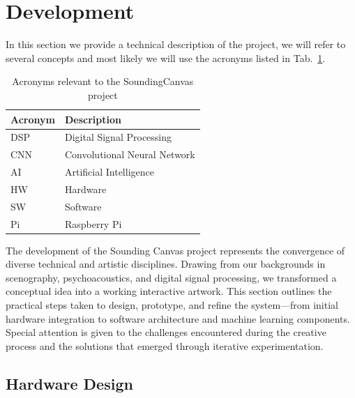 \documentclass{article}
\begin{document}
\section{Development}
In this section we provide a technical description of the project, we will refer to several concepts and most likely we will use the acronyms listed in Tab.~\ref{table:Acronyms}.
\begin{table}[h]
	\centering
	\begin{tabularx}{\textwidth} { 
			| >{\centering\arraybackslash}X
			| >{\centering\arraybackslash}X | }
		\hline
		\rowcolor{Gray}
		\textbf{Acronym} & \textbf{Description}\\
		\hline
		DSP & Digital Signal Processing \\
		\hline
		CNN & Convolutional Neural Network \\
		\hline
		AI & Artificial Intelligence \\
		\hline
		HW & Hardware \\
		\hline
		SW & Software \\
		\hline
		Pi & Raspberry Pi \\
		\hline
	\end{tabularx}
	\caption{Acronyms relevant to the SoundingCanvas project}
	\label{table:Acronyms}
\end{table}
The development of the Sounding Canvas project represents the convergence of diverse technical and artistic disciplines. Drawing from our backgrounds in scenography, psychoacoustics, and digital signal processing, we transformed a conceptual idea into a working interactive artwork. This section outlines the practical steps taken to design, prototype, and refine the system—from initial hardware integration to software architecture and machine learning components. Special attention is given to the challenges encountered during the creative process and the solutions that emerged through iterative experimentation.

\subsection{Hardware Design}
\end{document}
